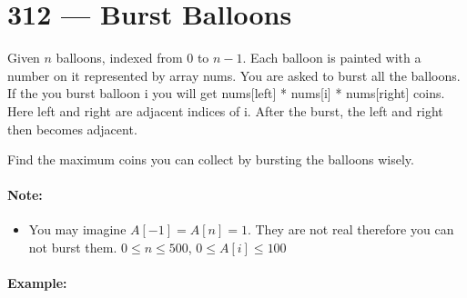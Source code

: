 \section{312 --- Burst Balloons}
Given $ n $ balloons, indexed from 0 to $ n-1 $. Each balloon is painted with a number on it represented by array nums. You are asked to burst all the balloons. If the you burst balloon i you will get nums[left] * nums[i] * nums[right] coins. Here left and right are adjacent indices of i. After the burst, the left and right then becomes adjacent.
\par
Find the maximum coins you can collect by bursting the balloons wisely.

\paragraph{Note:}

\begin{itemize}
\item You may imagine $A[-1] = A[n] = 1$. They are not real therefore you can not burst them.
$0 \leq n \leq 500$, $0 \leq A[i] \leq 100$
\end{itemize}

\paragraph{Example:}

